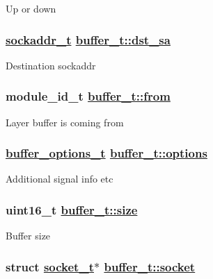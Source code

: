 Up or down \hypertarget{structbuffer__t_77292f1f1beee8363cf331027cd4f76a}{
\subsubsection[dst\_\-sa]{\setlength{\rightskip}{0pt plus 5cm}\hyperlink{structsockaddr__t}{sockaddr\_\-t} \hyperlink{structbuffer__t_77292f1f1beee8363cf331027cd4f76a}{buffer\_\-t::dst\_\-sa}}}
\label{structbuffer__t_77292f1f1beee8363cf331027cd4f76a}


Destination sockaddr \hypertarget{structbuffer__t_57786381935d453fb5f30d6c7a0fd149}{
\subsubsection[from]{\setlength{\rightskip}{0pt plus 5cm}module\_\-id\_\-t \hyperlink{structbuffer__t_57786381935d453fb5f30d6c7a0fd149}{buffer\_\-t::from}}}
\label{structbuffer__t_57786381935d453fb5f30d6c7a0fd149}


Layer buffer is coming from \hypertarget{structbuffer__t_49d73f996520c91c472dd68bc7005e70}{
\subsubsection[options]{\setlength{\rightskip}{0pt plus 5cm}\hyperlink{structbuffer__options__t}{buffer\_\-options\_\-t} \hyperlink{structbuffer__t_49d73f996520c91c472dd68bc7005e70}{buffer\_\-t::options}}}
\label{structbuffer__t_49d73f996520c91c472dd68bc7005e70}


Additional signal info etc \hypertarget{structbuffer__t_71b3f12052a171249ae6ad4e08e93ec4}{
\subsubsection[size]{\setlength{\rightskip}{0pt plus 5cm}uint16\_\-t \hyperlink{structbuffer__t_71b3f12052a171249ae6ad4e08e93ec4}{buffer\_\-t::size}}}
\label{structbuffer__t_71b3f12052a171249ae6ad4e08e93ec4}


Buffer size \hypertarget{structbuffer__t_b3d08149c91ea5c32d3808dfc369708c}{
\subsubsection[socket]{\setlength{\rightskip}{0pt plus 5cm}struct \hyperlink{structsocket__t}{socket\_\-t}$\ast$ \hyperlink{structbuffer__t_b3d08149c91ea5c32d3808dfc369708c}{buffer\_\-t::socket}}}
\label{structbuffer__t_b3d08149c91ea5c32d3808dfc369708c}


